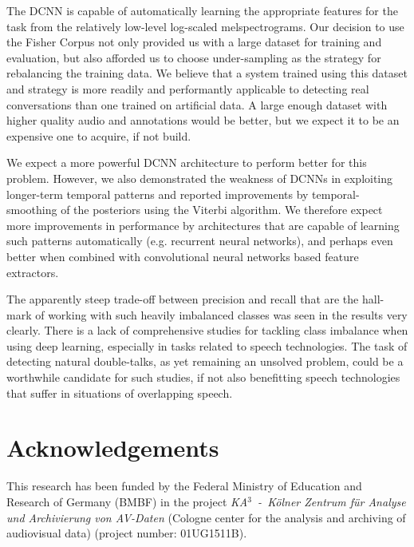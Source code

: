 \documentclass[a4paper]{article}
\begin{document}
The DCNN is capable of automatically learning the appropriate features for the task from the relatively low-level log-scaled melspectrograms.
Our decision to use the Fisher Corpus not only provided us with a large dataset for training and evaluation,
but also afforded us to choose under-sampling as the strategy for rebalancing the training data.
We believe that a system trained using this dataset and strategy is more readily and performantly applicable to detecting real conversations than one trained on artificial data.
A large enough dataset with higher quality audio and annotations would be better,
but we expect it to be an expensive one to acquire, if not build.

We expect a more powerful DCNN architecture to perform better for this problem.
However, we also demonstrated the weakness of DCNNs in exploiting longer-term temporal patterns
and reported improvements by temporal-smoothing of the posteriors using the Viterbi algorithm.
We therefore expect more improvements in performance by architectures that are capable of learning such patterns automatically (e.g. recurrent neural networks),
and perhaps even better when combined with convolutional neural networks based feature extractors.

The apparently steep trade-off between precision and recall that are the hall-mark of working with such heavily imbalanced classes was seen in the results very clearly.
There is a lack of comprehensive studies for tackling class imbalance when using deep learning,
especially in tasks related to speech technologies.
The task of detecting natural double-talks, as yet remaining an unsolved problem,
could be a worthwhile candidate for such studies,
if not also benefitting speech technologies that suffer in situations of overlapping speech.


\section{Acknowledgements}
This research has been funded by the Federal Ministry of Education and Research of Germany (BMBF) in the project \textit{KA$^3$~-~K{\"o}lner Zentrum für Analyse und Archivierung von AV-Daten} (Cologne center for the analysis and archiving of audiovisual data) (project number: 01UG1511B).



\end{document}
